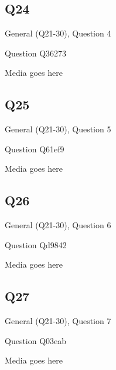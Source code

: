 \documentclass[11pt]{beamer}
\begin{document}
\subsection*{Q24}
\begin{frame}[t]{General (Q21-30), Question 4}
\vspace{2em}
\begin{block}{Question}
Q36273
\end{block}
\begin{center}
Media goes here
\end{center}
\end{frame}
    

\subsection*{Q25}
\begin{frame}[t]{General (Q21-30), Question 5}
\vspace{2em}
\begin{block}{Question}
Q61ef9
\end{block}
\begin{center}
Media goes here
\end{center}
\end{frame}
    

\subsection*{Q26}
\begin{frame}[t]{General (Q21-30), Question 6}
\vspace{2em}
\begin{block}{Question}
Qd9842
\end{block}
\begin{center}
Media goes here
\end{center}
\end{frame}
    

\subsection*{Q27}
\begin{frame}[t]{General (Q21-30), Question 7}
\vspace{2em}
\begin{block}{Question}
Q03eab
\end{block}
\begin{center}
Media goes here
\end{center}
\end{frame}
    
\end{document}
